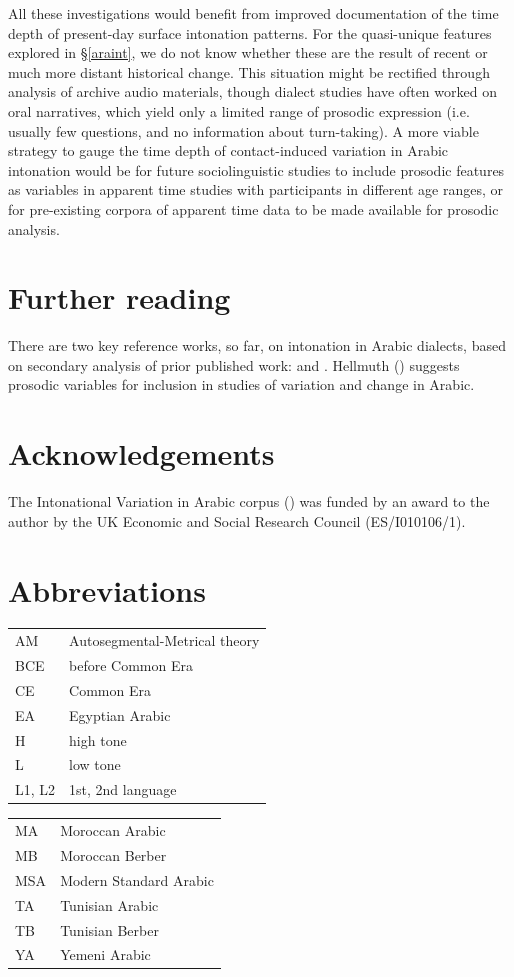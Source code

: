 \documentclass[output=paper]{langsci/langscibook}
\begin{document}
All these investigations would benefit from improved documentation of the time depth of present-day surface intonation patterns. For the quasi-unique features explored in §\ref{araint}, we do not know whether these are the result of recent or much more distant historical change. This situation might be rectified through analysis of archive audio materials, though dialect studies have often worked on oral narratives, which yield only a limited range of prosodic expression (i.e. usually few questions, and no information about turn-taking). A more viable strategy to gauge the time depth of contact-induced variation in Arabic intonation would be for future sociolinguistic studies to include prosodic features as variables in apparent time studies with participants in different age ranges, or for pre-existing corpora of apparent time data to be made available for prosodic analysis.

\section*{Further reading}

There are two key reference works, so far, on intonation in Arabic dialects, based on secondary analysis of prior published work: \citet{Chahal2011} and \citet{ElZarka2017}. Hellmuth (\citeyear{Hellmuth2019}) suggests prosodic variables for inclusion in studies of variation and change in Arabic. 

\section*{Acknowledgements}

The Intonational Variation in Arabic corpus (\citeyear{HellmuthAlmbark2017}) was funded by an award to the author by the UK Economic and Social Research Council (ES/I010106/1).

\section*{Abbreviations}

\begin{tabularx}{.5\textwidth}{@{}lQ@{}}
AM & Autosegmental-Metrical theory \\
BCE & before Common Era \\
CE & Common Era \\
EA & Egyptian Arabic \\
H & high tone \\
L & low tone \\
L1, L2 & 1st, 2nd language \\
\end{tabularx}%
\begin{tabularx}{.5\textwidth}{@{}lQ@{}}
MA & Moroccan Arabic \\
MB & Moroccan Berber \\
MSA & Modern Standard Arabic \\
TA & Tunisian Arabic \\
TB & Tunisian Berber \\
YA & Yemeni Arabic \\
\end{tabularx}%


\sloppy
\printbibliography[heading=subbibliography,notkeyword=this]
\end{document}
